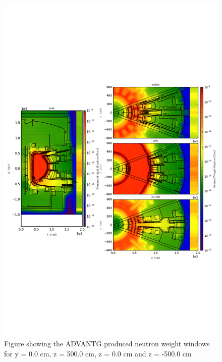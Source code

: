 \documentclass[12pt]{article}
\begin{document}
\begin{figure}[ht!]
  \centering
  \includegraphics[trim={0cm 9cm 0cm 10cm},clip,scale=0.75]{../plots/wwinp/Neutron_Weight_Windows.png}
  \caption{Figure showing the ADVANTG produced neutron weight windows for y = 0.0 cm,
  z = 500.0 cm, z = 0.0 cm and z = -500.0 cm}
  \label{fig:wwinp}
\end{figure}

\end{document}
